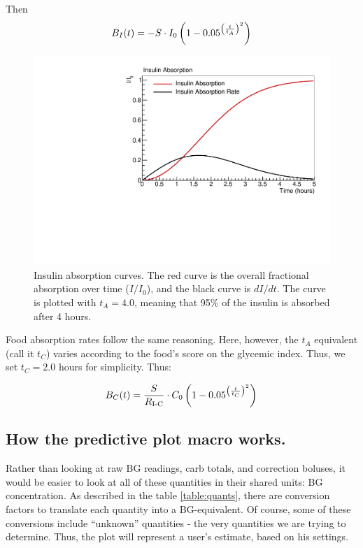 Then
\begin{equation}
{B_I}(t) = -S\cdot I_0\left( 1 - 0.05^{\left({t\over{t_A}}\right)^2} \right)
\label{eq:insulin}
\end{equation}

\begin{figure}[htbp]
\begin{center}
\includegraphics[width=4.5in]{figures/absorption.pdf}
\caption{Insulin absorption curves. The red curve is the overall fractional absorption over time ($I/I_0$), and the black curve is $dI/dt$. The curve is plotted with $t_A=4.0$, meaning that 95\% of the insulin is absorbed after 4 hours.}
\label{default}
\end{center}
\end{figure}

Food absorption rates follow the same reasoning. Here, however, the $t_A$  equivalent (call it $t_C$) varies according to the food's score on the glycemic index. Thus, we set $t_C=2.0$ hours for simplicity. Thus:

\begin{equation}
{B_C}(t) = {S\over R_\text{I-C}}\cdot C_0\left( 1 - 0.05^{\left({t\over{t_C}}\right)^2} \right)
\label{eq:carb}
\end{equation}

\subsection{How the predictive plot macro works.} 

Rather than looking at raw BG readings, carb totals, and correction boluses, it would be easier to look at all of these quantities in their shared units: BG concentration. As described in the table \ref{table:quants}, there are conversion factors to translate each quantity into a BG-equivalent. Of course, some of these conversions include ``unknown'' quantities - the very quantities we are trying to determine. Thus, the plot will represent a user's estimate, based on his settings.


